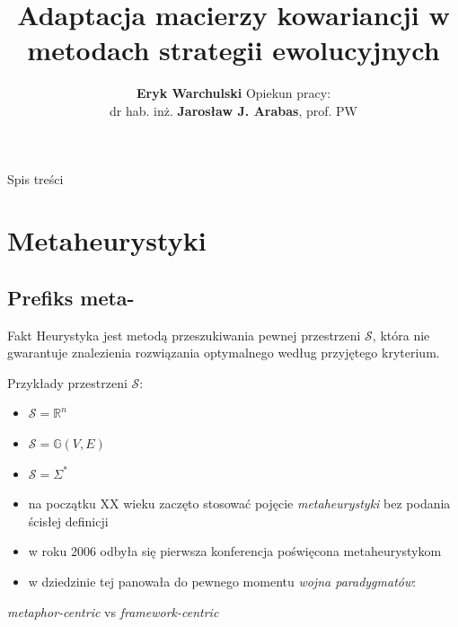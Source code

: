 \documentclass[slidescentered]{beamer}
\title{Adaptacja macierzy kowariancji w metodach strategii ewolucyjnych}
\author[Eryk Warchulski]{\textbf{Eryk Warchulski} \newline \footnotesize{Opiekun pracy: \\ dr hab. inż. \textbf{Jarosław J. Arabas}, prof. PW}}
\institute[II]{\textit{Politechnika Warszawska \\
			Wydział Elektroniki i Technik Informacyjnych}}
\date{}
\begin{document}
\begin{frame}
	\titlepage
\end{frame}


\begin{frame}{Spis treści}
	\tableofcontents
\end{frame}



\section{Metaheurystyki}
\subsection{Prefiks meta-}

\begin{frame}
	\begin{block}{Fakt}
		Heurystyka jest metodą przeszukiwania pewnej przestrzeni $\mathcal{S}$, która nie gwarantuje znalezienia rozwiązania optymalnego według przyjętego kryterium. 
	\end{block}
\pause
Przykłady przestrzeni $\mathcal{S}$:
\begin{itemize}
	\pause \item $\mathcal{S} = \mathbb{R}^{n}$
	\pause \item $\mathcal{S} = \mathbb{G}(V, E)$
	\pause \item $\mathcal{S} = \Sigma^{*}$
\end{itemize}
\end{frame}


\begin{frame}
	\begin{itemize}
		\item na początku XX wieku zaczęto stosować pojęcie \textit{metaheurystyki} bez podania ścisłej definicji 
		\pause
		\item w roku 2006 odbyła się pierwsza konferencja poświęcona metaheurystykom 
		\pause
		\item w dziedzinie tej panowała do pewnego momentu \textit{wojna paradygmatów}:
	\end{itemize}
	\begin{center}
		\textit{metaphor-centric} vs \textit{framework-centric} 
		\pause
	\end{center}
\end{frame}
\end{document}
